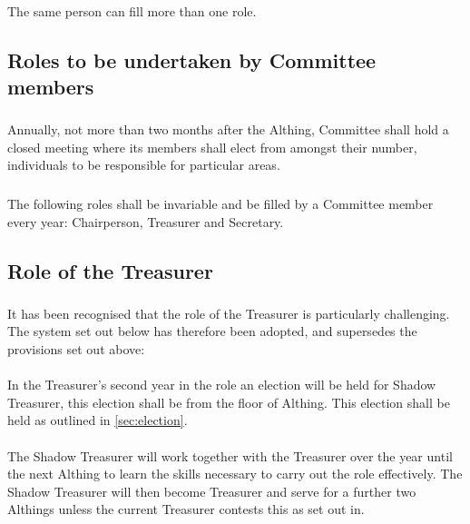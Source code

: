 \documentclass[a4paper, 12pt]{article}
\begin{document}
\paragraph{}
\label{sec:moreroles}
The same person can fill more than one role.

\subsection{Roles to be undertaken by Committee members}
\subsubsection{}
Annually, not more than two months after the Althing, Committee shall hold a closed meeting where its members shall elect from amongst their number, individuals to be responsible for particular areas.
\subsubsection{}
The following roles shall be invariable and be filled by a Committee member every year: Chairperson, Treasurer and Secretary.

\subsection{Role of the Treasurer}
\label{sec:treasurerrole}
\subsubsection{}
It has been recognised that the role of the Treasurer is particularly challenging. The system set out below has therefore been adopted, and supersedes the provisions set out above:
\paragraph{}
In the Treasurer's second year in the role an election will be held for Shadow Treasurer, this election shall be from the floor of Althing. This election shall be held as outlined in \ref{sec:election}.
\paragraph{}
The Shadow Treasurer will work together with the Treasurer over the year until the next Althing to learn the skills necessary to carry out the role effectively. The Shadow Treasurer will then become Treasurer and serve for a further two Althings unless the current Treasurer contests this as set out in.
\end{document}
